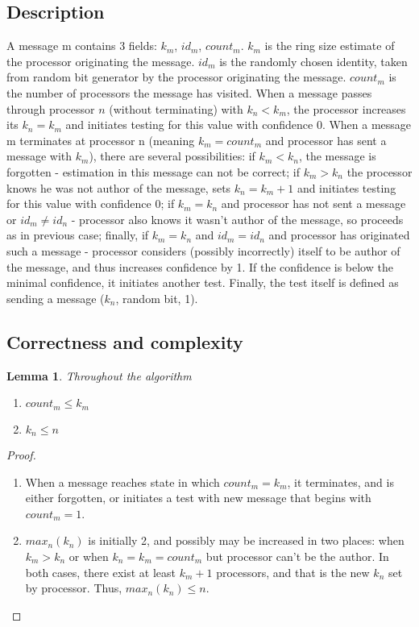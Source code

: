 \documentclass{article}
\newtheorem{lemma}{Lemma}
\begin{document}
\subsection{Description}
A message m contains 3 fields: $k_m$, $id_m$, $count_m$. $k_m$ is the ring size estimate of the processor originating the message. $id_m$ is the randomly chosen identity, taken from random bit generator by the processor originating the message. $count_m$ is the number of processors the message has visited. When a message passes through processor $n$ (without terminating) with $k_n < k_m$, the processor increases its $k_n = k_m$ and initiates testing for this value with confidence 0. When a message m terminates at processor n (meaning $k_m = count_m$ and processor has sent a message with $k_m$), there are several possibilities: if $k_m < k_n$, the message is forgotten - estimation in this message can not be correct; if $k_m > k_n$ the processor knows he was not author of the message, sets $k_n = k_m + 1$ and initiates testing for this value with confidence 0; if $k_m = k_n$ and processor has not sent a message or $id_m \neq id_n$ - processor also knows it wasn't author of the message, so proceeds as in previous case; finally, if $k_m = k_n$ and $id_m = id_n$ and processor has originated such a message - processor considers (possibly incorrectly) itself to be author of the message, and thus increases confidence by 1. If the confidence is below the minimal confidence, it initiates another test. Finally, the test itself is defined as sending a message ($k_n$, random bit, 1).
\subsection{Correctness and complexity}
\begin{lemma}
Throughout the algorithm
\begin{enumerate}
    \item $count_m \leq k_m$
    \item $k_n \leq n$
\end{enumerate}
\end{lemma}
\begin{proof}
\begin{enumerate}
    \item When a message reaches state in which $count_m = k_m$, it terminates, and is either forgotten, or initiates a test with new message that begins with $count_m = 1$.
    \item $max_n(k_n)$ is initially 2, and possibly may be increased in two places: when $k_m > k_n$ or when $k_n = k_m = count_m$ but processor can't be the author. In both cases, there exist at least $k_m + 1$ processors, and that is the new $k_n$ set by processor. Thus, $max_n(k_n) \leq n$.
\end{enumerate}
\end{proof}
\end{document}
